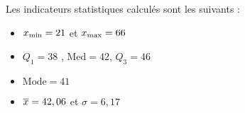\medskip

Les indicateurs statistiques calculés sont les suivants :
\begin{itemize}
\item $x_{\text{min}}=21$ et $x_{\text{max}}=66$
\item $Q_1=38$ , $\text{Med}=42$, $Q_3=46$
\item $\text{Mode}=41$
\item $\overline{x}=42,06$ et $\sigma=6,17$
\end{itemize}
